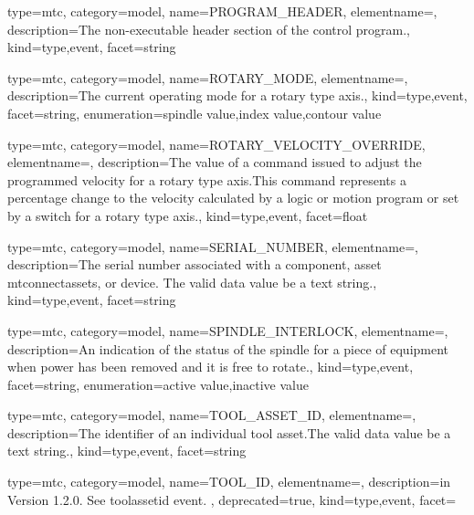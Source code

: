 {
  type=mtc,
  category=model,
  name={PROGRAM\_HEADER},
  elementname=,
  description={The non-executable header section of the control program.},
  kind={type,event},
  facet={\gls{string}}
}


{
  type=mtc,
  category=model,
  name={ROTARY\_MODE},
  elementname=,
  description={The current operating mode for a \gls{rotary} type axis.},
  kind={type,event},
  facet={\gls{string}},
  enumeration={\gls{spindle value},\gls{index value},\gls{contour value}}
}


{
  type=mtc,
  category=model,
  name={ROTARY\_VELOCITY\_OVERRIDE},
  elementname=,
  description={The value of a command issued to adjust the programmed velocity for a \gls{rotary} type axis.\newline This command represents a percentage change to the velocity calculated by a logic or motion program or set by a switch for a \gls{rotary} type axis.},
  kind={type,event},
  facet={\gls{float}}
}


{
  type=mtc,
  category=model,
  name={SERIAL\_NUMBER},
  elementname=,
  description={The serial number associated with a \gls{component}, \gls{asset mtconnectassets}, or \gls{device}. The \gls{valid data value} \must be a text string.},
  kind={type,event},
  facet={\gls{string}}
}


{
  type=mtc,
  category=model,
  name={SPINDLE\_INTERLOCK},
  elementname=,
  description={An indication of the status of the spindle for a piece of equipment when power has been removed and it is free to rotate.},
  kind={type,event},
  facet={\gls{string}},
  enumeration={\gls{active value},\gls{inactive value}}
}


{
  type=mtc,
  category=model,
  name={TOOL\_ASSET\_ID},
  elementname=,
  description={The identifier of an individual tool asset.The \gls{valid data value} \must be a text string.},
  kind={type,event},
  facet={\gls{string}}
}


{
  type=mtc,
  category=model,
  name={TOOL\_ID},
  elementname=,
  description={\DEPRECATED in Version 1.2.0.   See \gls{toolassetid event}. },
  deprecated={true},
  kind={type,event},
  facet={}
}


